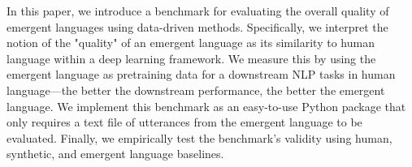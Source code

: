 In this paper, we introduce a benchmark for evaluating the overall quality of emergent languages using data-driven methods. Specifically, we interpret the notion of the "quality" of an emergent language as its similarity to human language within a deep learning framework. We measure this by using the emergent language as pretraining data for a downstream NLP tasks in human language---the better the downstream performance, the better the emergent language. We implement this benchmark as an easy-to-use Python package that only requires a text file of utterances from the emergent language to be evaluated. Finally, we empirically test the benchmark's validity using human, synthetic, and emergent language baselines.